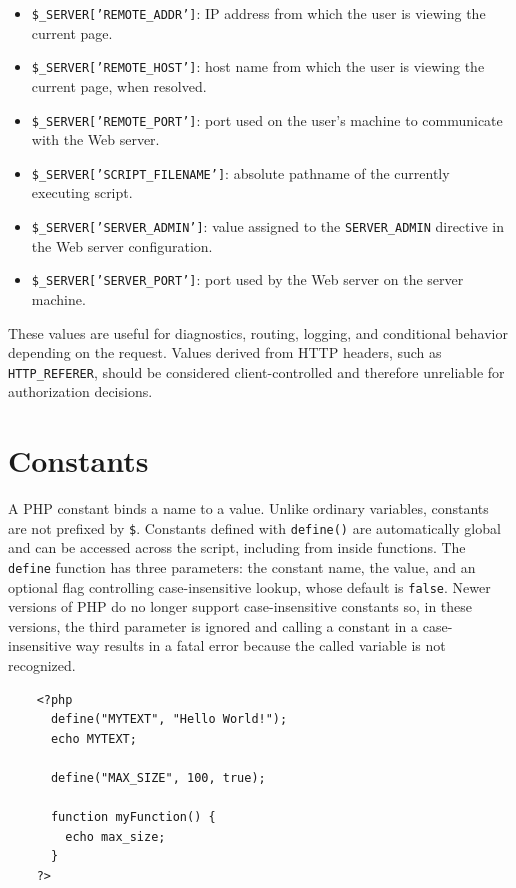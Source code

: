 \documentclass{scrbook}
\begin{document}
\begin{itemize}
		\item \texttt{\$\_SERVER['REMOTE\_ADDR']}: IP address from which the user is viewing the current page.
		
		\item \texttt{\$\_SERVER['REMOTE\_HOST']}: host name from which the user is viewing the current page, when resolved.
		
		\item \texttt{\$\_SERVER['REMOTE\_PORT']}: port used on the user's machine to communicate with the Web server.
		
		\item \texttt{\$\_SERVER['SCRIPT\_FILENAME']}: absolute pathname of the currently executing script.
		
		\item \texttt{\$\_SERVER['SERVER\_ADMIN']}: value assigned to the \texttt{SERVER\_ADMIN} directive in the Web server configuration.
		
		\item \texttt{\$\_SERVER['SERVER\_PORT']}: port used by the Web server on the server machine.
	\end{itemize}
	
	These values are useful for diagnostics, routing, logging, and conditional behavior depending on the request. Values derived from HTTP headers, such as \texttt{HTTP\_REFERER}, should be considered client-controlled and therefore unreliable for authorization decisions.
	
	\section{Constants}
	
	A PHP constant binds a name to a value. Unlike ordinary variables, constants are not prefixed by \texttt{\$}. Constants defined with \texttt{define()} are automatically global and can be accessed across the script, including from inside functions. The \texttt{define} function has three parameters: the constant name, the value, and an optional flag controlling case-insensitive lookup, whose default is \texttt{false}. Newer versions of PHP do no longer support case-insensitive constants so, in these versions, the third parameter is ignored and calling a constant in a case-insensitive way results in a fatal error because the called variable is not recognized.
	
	\begin{lstlisting}
	<?php
	  define("MYTEXT", "Hello World!");
	  echo MYTEXT;
		
	  define("MAX_SIZE", 100, true);
		
	  function myFunction() {
		echo max_size;
	  }
	?>
	\end{lstlisting}
	
\end{document}
